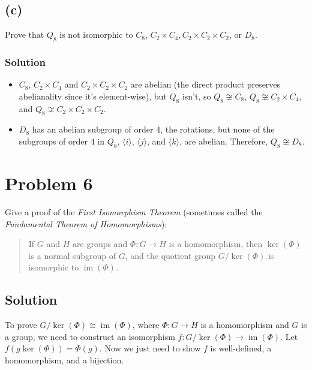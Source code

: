 \documentclass[fleqn]{article}
\DeclareMathOperator{\im}{im}
\begin{document}
        \subsection{(c)}
        Prove that $Q_8$ is not isomorphic to $C_8$, $C_2 \times C_4, C_2 \times C_2 \times C_2$, or $D_8$.
            
            \subsubsection{Solution}
            \begin{itemize}
                
                \item $C_8$, $C_2 \times C_4$ and $C_2 \times C_2 \times C_2$ are abelian (the direct product preserves abelianality since it's element-wise), but $Q_8$ isn't, so $Q_8 \not\cong C_8$, $Q_8 \not\cong C_2 \times C_4$, and $Q_8 \not\cong C_2 \times C_2 \times C_2$.
                
                \item $D_8$ has an abelian subgroup of order 4, the rotations, but none of the subgroups of order 4 in $Q_8$, $\langle i \rangle$, $\langle j \rangle$, and $\langle k \rangle$, are abelian.  Therefore, $Q_8 \not\cong D_8$.
                
            \end{itemize}
        
    \section{Problem 6}
    Give a proof of the \textit{First Isomorphism Theorem} (sometimes called the \textit{Fundamental Theorem of Homomorphisms}): 
    \begin{quote}
        If $G$ and $H$ are groups and $\Phi: G \to H$ is a homomorphism, then $\ker(\Phi)$ is a normal subgroup of $G$, and the quotient group $G/\ker(\Phi)$ is isomorphic to $\im(\Phi)$.
    \end{quote}
        
        \subsection{Solution}
        To prove $G/\ker(\Phi) \cong \im(\Phi)$, where $\Phi: G \to H$ is a homomorphism and $G$ is a group, we need to construct an isomorphism $f: G/\ker(\Phi) \to \im(\Phi)$.  Let $f(g \ker(\Phi)) = \Phi(g)$.  Now we just need to show $f$ is well-defined, a homomorphism, and a bijection.
        
\end{document}
